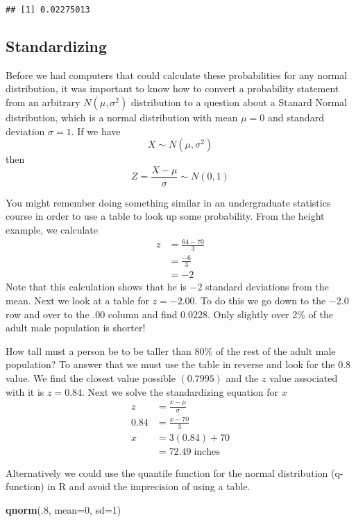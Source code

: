 \documentclass[]{book}
\newenvironment{Shaded}{\begin{snugshade}}{\end{snugshade}}
\newcommand{\KeywordTok}[1]{\textcolor[rgb]{0.13,0.29,0.53}{\textbf{{#1}}}}
\newcommand{\DataTypeTok}[1]{\textcolor[rgb]{0.13,0.29,0.53}{{#1}}}
\newcommand{\DecValTok}[1]{\textcolor[rgb]{0.00,0.00,0.81}{{#1}}}
\newcommand{\NormalTok}[1]{{#1}}
\begin{document}
\begin{verbatim}
## [1] 0.02275013
\end{verbatim}

\subsection{Standardizing}\label{standardizing}

Before we had computers that could calculate these probabilities for any
normal distribution, it was important to know how to convert a
probability statement from an arbitrary \(N\left(\mu,\sigma^{2}\right)\)
distribution to a question about a Stanard Normal distribution, which is
a normal distribution with mean \(\mu=0\) and standard deviation
\(\sigma=1\). If we have \[X\sim N\left(\mu,\sigma^{2}\right)\] then
\[Z=\frac{X-\mu}{\sigma}\sim N\left(0,1\right)\]

You might remember doing something similar in an undergraduate
statistics course in order to use a table to look up some probability.
From the height example, we calculate \[\begin{aligned}z  
  &=    \frac{64-70}{3} \\
    &=  \frac{-6}{3} \\
    &=  -2 \end{aligned}\] Note that this calculation shows that he is
\(-2\) standard deviations from the mean. Next we look at a table for
\(z=-2.00\). To do this we go down to the \(-2.0\) row and over to the
\(.00\) column and find \(0.0228\). Only slightly over 2\% of the adult
male population is shorter!

How tall must a person be to be taller than \(80\%\) of the rest of the
adult male population? To answer that we must use the table in reverse
and look for the \(0.8\) value. We find the closest value possible
\((0.7995)\) and the \(z\) value associated with it is \(z=0.84\). Next
we solve the standardizing equation for \(x\) \[\begin{aligned}
z       &=  \frac{x-\mu}{\sigma} \\
0.84    &=  \frac{x-70}{3} \\
x       &=  3(0.84)+70 \\
        &=  72.49\;\textrm{inches} \end{aligned}\]

Alternatively we could use the quantile function for the normal
distribution (q-function) in R and avoid the imprecision of using a
table.

\begin{Shaded}
\begin{Highlighting}[]
\KeywordTok{qnorm}\NormalTok{(.}\DecValTok{8}\NormalTok{, }\DataTypeTok{mean=}\DecValTok{0}\NormalTok{, }\DataTypeTok{sd=}\DecValTok{1}\NormalTok{)}
\end{Highlighting}
\end{Shaded}
\end{document}
